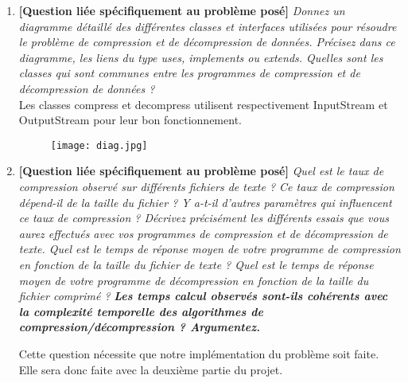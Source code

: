 \documentclass[11pt]{article}
\begin{document}
\begin{enumerate}
\item \textbf{[Question liée spécifiquement au problème posé]} \textit{Donnez un diagramme détaillé des différentes classes et interfaces utilisées pour résoudre le problème de compression et de décompression de données. Précisez dans ce diagramme, les liens du type uses, implements ou extends. Quelles sont les classes qui sont communes entre les programmes de compression et de décompression de données ?}\\
Les classes compress et decompress utilisent respectivement InputStream et OutputStream pour leur bon fonctionnement. 
\begin{figure} [!h]
\center
\texttt{[image: diag.jpg]}
\end{figure}
\item \textbf{[Question liée spécifiquement au problème posé]} \textit{Quel est le taux de compression
observé sur différents fichiers de texte ? Ce taux de compression dépend-il
de la taille du fichier ? Y a-t-il d’autres paramètres qui influencent ce taux de
compression ? Décrivez précisément les différents essais que vous aurez effectués
avec vos programmes de compression et de décompression de texte.
Quel est le temps de réponse moyen de votre programme de compression en
fonction de la taille du fichier de texte ? Quel est le temps de réponse moyen de
votre programme de décompression en fonction de la taille du fichier comprimé ?}
\textit{\textbf{Les temps calcul observés sont-ils cohérents avec la complexité temporelle
des algorithmes de compression/décompression ? Argumentez.}}

Cette question nécessite que notre implémentation du problème soit faite. 
Elle sera donc faite avec la deuxième partie du projet.

\end{enumerate}
\end{document}
